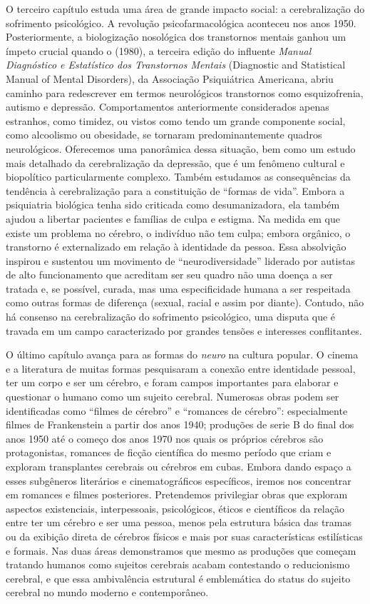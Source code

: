 O terceiro capítulo estuda uma área de grande impacto social: a
cerebralização do sofrimento psicológico. A revolução psicofarmacológica
aconteceu nos anos 1950. Posteriormente, a biologização nosológica dos
transtornos mentais ganhou um ímpeto crucial quando o   (1980), a
terceira edição do influente \emph{Manual Diagnóstico e Estatístico dos
Transtornos Mentais} (Diagnostic and Statistical Manual of Mental
Disorders), da Associação Psiquiátrica Americana, abriu caminho para
redescrever em termos neurológicos transtornos como esquizofrenia,
autismo e depressão. Comportamentos anteriormente considerados apenas
estranhos, como timidez, ou vistos como tendo um grande componente
social, como alcoolismo ou obesidade, se tornaram predominantemente
quadros neurológicos. Oferecemos uma panorâmica dessa situação, bem como
um estudo mais detalhado da cerebralização da depressão, que é um
fenômeno cultural e biopolítico particularmente complexo. Também
estudamos as consequências da tendência à cerebralização para a
constituição de ``formas de vida''. Embora a psiquiatria biológica tenha
sido criticada como desumanizadora, ela também ajudou a libertar
pacientes e famílias de culpa e estigma. Na medida em que existe um
problema no cérebro, o indivíduo não tem culpa; embora orgânico, o
transtorno é externalizado em relação à identidade da pessoa. Essa
absolvição inspirou e sustentou um movimento de ``neurodiversidade''
liderado por autistas de alto funcionamento que acreditam ser seu quadro
não uma doença a ser tratada e, se possível, curada, mas uma
especificidade humana a ser respeitada como outras formas de diferença
(sexual, racial e assim por diante). Contudo, não há consenso na
cerebralização do sofrimento psicológico, uma disputa que é travada em
um campo caracterizado por grandes tensões e interesses conflitantes.

O último capítulo avança para as formas do \emph{neuro} na cultura
popular. O cinema e a literatura de muitas formas pesquisaram a conexão
entre identidade pessoal, ter um corpo e ser um cérebro, e foram campos
importantes para elaborar e questionar o humano como um sujeito
cerebral. Numerosas obras podem ser identificadas como ``filmes de
cérebro'' e ``romances de cérebro'': especialmente filmes de
Frankenstein a partir dos anos 1940; produções de serie B do final dos
anos 1950 até o começo dos anos 1970 nos quais os próprios cérebros são
protagonistas, romances de ficção científica do mesmo período que criam
e exploram transplantes cerebrais ou cérebros em cubas. Embora dando
espaço a esses subgêneros literários e cinematográficos específicos,
iremos nos concentrar em romances e filmes posteriores. Pretendemos
privilegiar obras que exploram aspectos existenciais, interpessoais,
psicológicos, éticos e científicos da relação entre ter um cérebro e ser
uma pessoa, menos pela estrutura básica das tramas ou da exibição direta
de cérebros físicos e mais por suas características estilísticas e
formais. Nas duas áreas demonstramos que mesmo as produções que começam
tratando humanos como sujeitos cerebrais acabam contestando o
reducionismo cerebral, e que essa ambivalência estrutural é emblemática
do status do sujeito cerebral no mundo moderno e contemporâneo.


